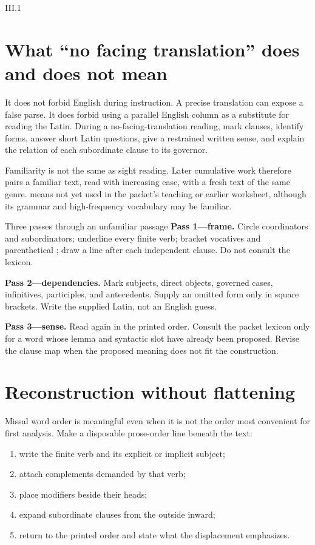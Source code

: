 \begin{courseunit}{III.1}
\section{What ``no facing translation'' does and does not mean}

It does not forbid English during instruction. A precise translation can expose
a false parse. It does forbid using a parallel English column as a substitute
for reading the Latin. During a no-facing-translation reading, mark clauses,
identify forms, answer short Latin questions, give a restrained written sense,
and explain the relation of each subordinate clause to its governor.

Familiarity is not the same as sight reading. Later cumulative work therefore
pairs a familiar text, read with increasing ease, with a fresh text of the same
genre.  means not yet used in the packet's teaching or earlier
worksheet, although its grammar and high-frequency vocabulary may be familiar.

\begin{grammarbox}{Three passes through an unfamiliar passage}
\textbf{Pass 1---frame.} Circle coordinators and subordinators; underline every
finite verb; bracket vocatives and parenthetical ; draw a line
after each independent clause. Do not consult the lexicon.

\textbf{Pass 2---dependencies.} Mark subjects, direct objects, governed cases,
infinitives, participles, and antecedents. Supply an omitted form only in square
brackets. Write the supplied Latin, not an English guess.

\textbf{Pass 3---sense.} Read again in the printed order. Consult the packet lexicon
only for a word whose lemma and syntactic slot have already been proposed.
Revise the clause map when the proposed meaning does not fit the construction.
\end{grammarbox}

\section{Reconstruction without flattening}

Missal word order is meaningful even when it is not the order most convenient
for first analysis. Make a disposable prose-order line beneath the text:

\begin{enumerate}
  \item write the finite verb and its explicit or implicit subject;
  \item attach complements demanded by that verb;
  \item place modifiers beside their heads;
  \item expand subordinate clauses from the outside inward;
  \item return to the printed order and state what the displacement emphasizes.
\end{enumerate}


\end{courseunit}
